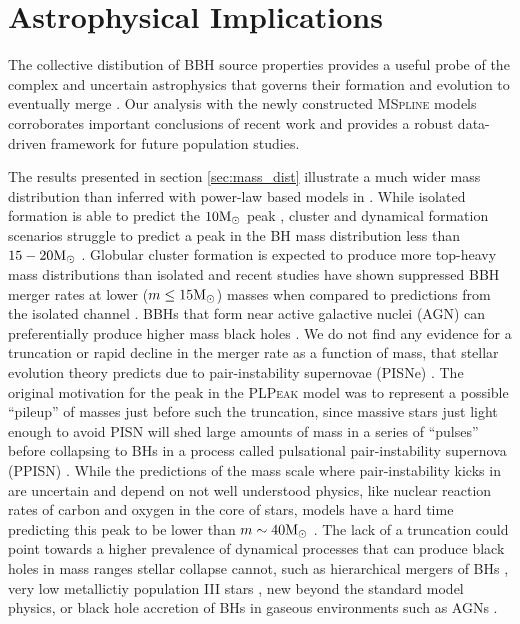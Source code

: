 \section{Astrophysical Implications}\label{sec:astrodiscussion}

The collective distibution of BBH source properties provides a useful probe of the complex and uncertain astrophysics that governs their 
formation and evolution to eventually merge \citep{Zevin_2017}. Our analysis with the newly constructed \textsc{MSpline} models corroborates important 
conclusions of recent work and provides a robust data-driven framework for future population studies. 

The results presented in section \ref{sec:mass_dist} illustrate a much wider mass distribution than inferred with power-law based models in \citet{o3b_astro_dist}. 
While isolated formation is able to predict the $10{\rm M}_\odot$ peak , cluster and dynamical formation scenarios struggle to predict a peak in the BH mass distribution less than 
$15-20{\rm M}_\odot$ . Globular cluster formation is expected to produce more top-heavy mass distributions than isolated and recent studies have shown suppressed BBH merger rates 
at lower ($m\leq15{\rm M}_\odot$) masses when compared to predictions from the isolated channel . BBHs that form near active galactive nuclei (AGN) can preferentially produce higher 
mass black holes . We do not find any evidence for a truncation or rapid decline in the merger rate as a function of mass, that stellar evolution theory predicts 
due to pair-instability supernovae (PISNe) \citep{Heger_2002,PISN_Woosley,Heger_2003,Spera_2017}. The original motivation for the peak in the \textsc{PLPeak} model \citep{Talbot_2018} was to represent a possible ``pileup'' of 
masses just before such the truncation, since massive stars just light enough to avoid PISN will shed large amounts of mass in a series of ``pulses'' before collapsing to BHs in a process called 
pulsational pair-instability supernova (PPISN) \citep{Woosley_2017,Woosley_2019,Farmer_2019}. While the predictions of the mass scale where pair-instability kicks in are uncertain and depend on not well understood physics, 
like nuclear reaction rates of carbon and oxygen in the core of stars, models have a hard time predicting this peak to be lower than $m\sim40{\rm M}_\odot$ \citep{Belczynski_2016,Marchant_2019,Renzo_2020,Farmer_2019,Farmer_2020}. The lack of a truncation could 
point towards a higher prevalence of dynamical processes that can produce black holes in mass ranges stellar collapse cannot, such as hierarchical mergers of BHs \citep{Fishbach_2017,Doctor_2020,Kimball_genealogy,kimball2020evidence,doctor2021black,Fishbach_2022}, 
very low metallictiy population III stars \citep{Belczynski_2020,Farrell_2020}, new beyond the standard model physics\cite{Croon_newphysics,Sakstein_2020}, or black hole accretion of BHs in gaseous environments such as AGNs \citep{Secunda_2020,McKernan_2020,cruzosorio2021gw190521}. 

